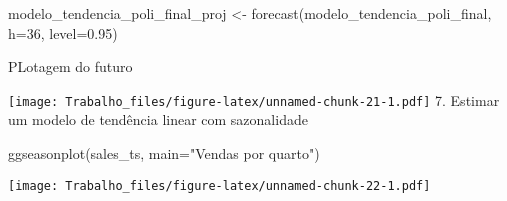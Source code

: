 \documentclass[
]{article}
\newenvironment{Shaded}{\begin{snugshade}}{\end{snugshade}}
\newcommand{\AttributeTok}[1]{\textcolor[rgb]{0.77,0.63,0.00}{#1}}
\newcommand{\DecValTok}[1]{\textcolor[rgb]{0.00,0.00,0.81}{#1}}
\newcommand{\FloatTok}[1]{\textcolor[rgb]{0.00,0.00,0.81}{#1}}
\newcommand{\FunctionTok}[1]{\textcolor[rgb]{0.00,0.00,0.00}{#1}}
\newcommand{\NormalTok}[1]{#1}
\newcommand{\OtherTok}[1]{\textcolor[rgb]{0.56,0.35,0.01}{#1}}
\newcommand{\SpecialCharTok}[1]{\textcolor[rgb]{0.00,0.00,0.00}{#1}}
\newcommand{\StringTok}[1]{\textcolor[rgb]{0.31,0.60,0.02}{#1}}
\begin{document}
\begin{Shaded}
\begin{Highlighting}[]
\NormalTok{modelo\_tendencia\_poli\_final\_proj }\OtherTok{\textless{}{-}} \FunctionTok{forecast}\NormalTok{(modelo\_tendencia\_poli\_final, }\AttributeTok{h=}\DecValTok{36}\NormalTok{, }\AttributeTok{level=}\FloatTok{0.95}\NormalTok{)}
\end{Highlighting}
\end{Shaded}

PLotagem do futuro

\begin{Shaded}
\end{Shaded}

\texttt{[image: Trabalho\_files/figure-latex/unnamed-chunk-21-1.pdf]} 7.
Estimar um modelo de tendência linear com sazonalidade

\begin{Shaded}
\begin{Highlighting}[]
\FunctionTok{ggseasonplot}\NormalTok{(sales\_ts, }\AttributeTok{main=}\StringTok{"Vendas por quarto"}\NormalTok{)}
\end{Highlighting}
\end{Shaded}

\texttt{[image: Trabalho\_files/figure-latex/unnamed-chunk-22-1.pdf]}
\end{document}
